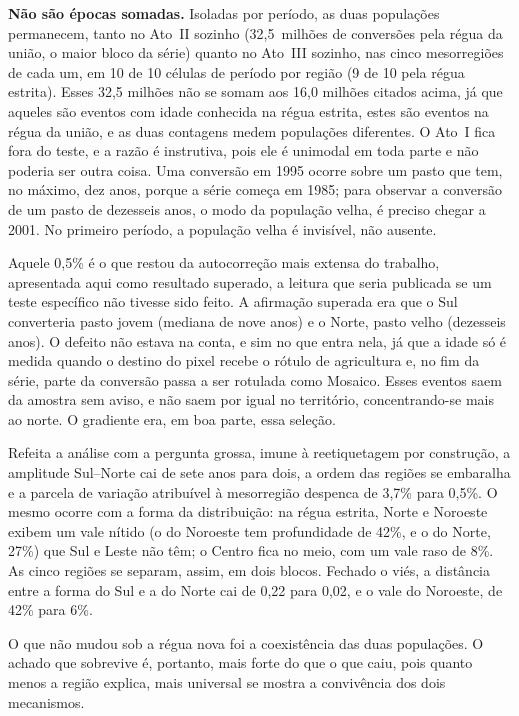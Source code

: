 \textbf{Não são épocas somadas.} Isoladas por período, as duas populações
permanecem, tanto no Ato~II sozinho (32,5~milhões de conversões pela régua da união,
o maior bloco da série) quanto no Ato~III sozinho, nas cinco mesorregiões de cada
um, em 10 de 10 células de período por região (9 de 10 pela régua estrita).
Esses 32,5 milhões não se somam aos 16,0 milhões citados acima, já que aqueles são
eventos com idade conhecida na régua estrita, estes são eventos na régua da
união, e as duas contagens medem populações diferentes. O Ato~I fica fora do
teste, e a razão é instrutiva, pois ele é unimodal em toda parte e não poderia ser
outra coisa. Uma conversão em 1995 ocorre sobre um pasto que tem, no máximo,
dez anos, porque a série começa em 1985; para observar a conversão de um pasto
de dezesseis anos, o modo da população velha, é preciso chegar a 2001. No
primeiro período, a população velha é invisível, não ausente.

Aquele 0,5\% é o que restou da autocorreção mais extensa do trabalho,
apresentada aqui como resultado superado, a leitura que seria publicada se um
teste específico não tivesse sido feito. A afirmação superada era que o Sul
converteria pasto jovem (mediana de nove anos) e o Norte, pasto velho
(dezesseis anos). O defeito não estava na conta, e sim no que entra nela, já que a
idade só é medida quando o destino do pixel recebe o rótulo de agricultura e,
no fim da série, parte da conversão passa a ser rotulada como Mosaico. Esses
eventos saem da amostra sem aviso, e não saem por igual no território,
concentrando-se mais ao norte. O gradiente era, em boa parte, essa seleção.

Refeita a análise com a pergunta grossa, imune à reetiquetagem por
construção, a amplitude Sul--Norte cai de sete anos para dois, a ordem
das regiões se embaralha e a parcela de variação atribuível à mesorregião
despenca de 3,7\% para 0,5\%. O mesmo ocorre com a forma da distribuição:
na régua estrita, Norte e Noroeste exibem um vale nítido (o do Noroeste tem
profundidade de 42\%, e o do Norte, 27\%) que Sul e Leste não têm; o Centro
fica no meio, com um vale raso de 8\%. As cinco regiões se separam, assim, em
dois blocos. Fechado o viés, a distância entre a
forma do Sul e a do Norte cai de 0,22 para 0,02, e o vale do Noroeste, de
42\% para 6\%.

O que não mudou sob a régua nova foi a coexistência das duas populações. O
achado que sobrevive é, portanto, mais forte do que o que caiu, pois quanto menos
a região explica, mais universal se mostra a convivência dos dois
mecanismos.

